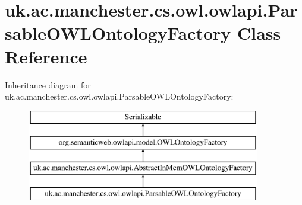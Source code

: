 \hypertarget{classuk_1_1ac_1_1manchester_1_1cs_1_1owl_1_1owlapi_1_1_parsable_o_w_l_ontology_factory}{\section{uk.\-ac.\-manchester.\-cs.\-owl.\-owlapi.\-Parsable\-O\-W\-L\-Ontology\-Factory Class Reference}
\label{classuk_1_1ac_1_1manchester_1_1cs_1_1owl_1_1owlapi_1_1_parsable_o_w_l_ontology_factory}
}
Inheritance diagram for uk.\-ac.\-manchester.\-cs.\-owl.\-owlapi.\-Parsable\-O\-W\-L\-Ontology\-Factory\-:\begin{figure}[H]
\begin{center}
\leavevmode
\includegraphics[height=4.000000cm]{classuk_1_1ac_1_1manchester_1_1cs_1_1owl_1_1owlapi_1_1_parsable_o_w_l_ontology_factory}
\end{center}
\end{figure}
